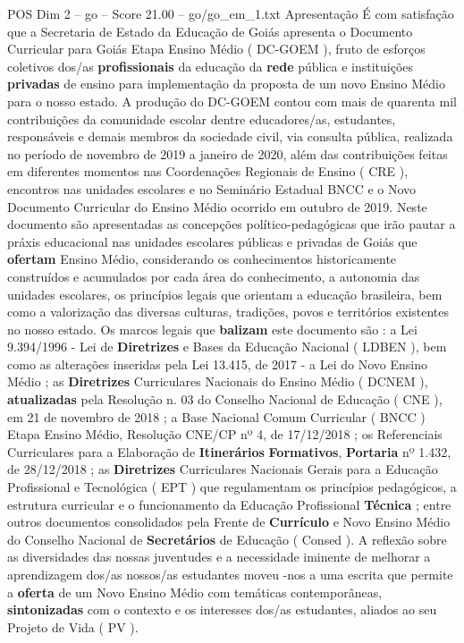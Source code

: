 \begin{textsample}{POS Dim 2 – go – Score 21.00 – go/go\_em\_1.txt}  \label{ex:f2_pos_178}
Apresentação É com satisfação que a Secretaria de Estado da Educação de Goiás apresenta o Documento Curricular para Goiás Etapa Ensino Médio ( DC-GOEM ), fruto de esforços coletivos dos/as \textbf{profissionais} da educação da \textbf{rede} pública e instituições \textbf{privadas} de ensino para implementação da proposta de um novo Ensino Médio para o nosso estado.
A produção do DC-GOEM contou com mais de quarenta mil contribuições da comunidade escolar dentre educadores/as, estudantes, responsáveis e demais membros da sociedade civil, via consulta pública, realizada no período de novembro de 2019 a janeiro de 2020, além das contribuições feitas em diferentes momentos nas Coordenações Regionais de Ensino ( CRE ), encontros nas unidades escolares e no Seminário Estadual BNCC e o Novo Documento Curricular do Ensino Médio ocorrido em outubro de 2019.
Neste documento são apresentadas as concepções político-pedagógicas que irão pautar a práxis educacional nas unidades escolares públicas e privadas de Goiás que \textbf{ofertam} Ensino Médio, considerando os conhecimentos historicamente construídos e acumulados por cada área do conhecimento, a autonomia das unidades escolares, os princípios legais que orientam a educação brasileira, bem como a valorização das diversas culturas, tradições, povos e territórios existentes no nosso estado.
Os marcos legais que \textbf{balizam} este documento são : a Lei 9.394/1996 - Lei de \textbf{Diretrizes} e Bases da Educação Nacional ( LDBEN ), bem como as alterações inseridas pela Lei 13.415, de 2017 - a Lei do Novo Ensino Médio ; as \textbf{Diretrizes} Curriculares Nacionais do Ensino Médio ( DCNEM ), \textbf{atualizadas} pela Resolução n. 03 do Conselho Nacional de Educação ( CNE ), em 21 de novembro de 2018 ; a Base Nacional Comum Curricular ( BNCC ) Etapa Ensino Médio, Resolução CNE/CP nº 4, de 17/12/2018 ; os Referenciais Curriculares para a Elaboração de \textbf{Itinerários} \textbf{Formativos}, \textbf{Portaria} nº 1.432, de 28/12/2018 ; as \textbf{Diretrizes} Curriculares Nacionais Gerais para a Educação Profissional e Tecnológica ( EPT ) que regulamentam os princípios pedagógicos, a estrutura curricular e o funcionamento da Educação Profissional \textbf{Técnica} ; entre outros documentos consolidados pela Frente de \textbf{Currículo} e Novo Ensino Médio do Conselho Nacional de \textbf{Secretários} de Educação ( Consed ).
A reflexão sobre as diversidades das nossas juventudes e a necessidade iminente de melhorar a aprendizagem dos/as nossos/as estudantes moveu -nos a uma escrita que permite a \textbf{oferta} de um Novo Ensino Médio com temáticas contemporâneas, \textbf{sintonizadas} com o contexto e os interesses dos/as estudantes, aliados ao seu Projeto de Vida ( PV ).

\end{textsample}
